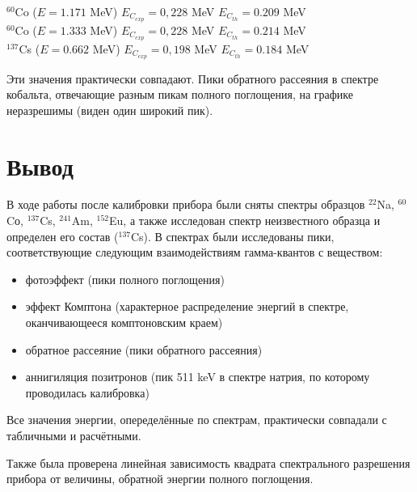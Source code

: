 \documentclass[a4paper, 12pt]{article}
\begin{document}
\begin{enumerate}
\begin{center}
  $^{60}$Co ($E = 1.171$ MeV) \hspace{1cm} $E_C_{exp} = 0,228$ MeV \hspace{1cm} $E_C_{th} = 0.209$ MeV \\
    $^{60}$Co ($E = 1.333$ MeV)\hspace{1cm} $E_C_{exp} = 0,228$ MeV \hspace{1cm} $E_C_{th} = 0.214$ MeV \\
$^{137}$Cs ($E = 0.662$ MeV)\hspace{1cm} $E_C_{exp} =0,198$ MeV \hspace{1cm} $E_C_{th} = 0.184$ MeV \\
\end{center}

Эти значения практически совпадают. Пики обратного рассеяния в спектре кобальта, отвечающие разным пикам полного поглощения, на графике неразрешимы (виден один широкий пик).

\end{enumerate}

\section*{Вывод}

В ходе работы после калибровки прибора были сняты спектры образцов $^{22}$Na,  $^{60}$Cо,  $^{137}$Cs, $^{241}$Am, $^{152}$Eu, а также исследован спектр неизвестного образца и определен его состав ($^{137}$Cs). В спектрах были исследованы пики, соответствующие следующим взаимодействиям гамма-квантов с веществом:
\begin{itemize}
    \item фотоэффект (пики полного поглощения)
    \item эффект Комптона (характерное распределение энергий в спектре, оканчивающееся комптоновским краем)
    \item обратное рассеяние (пики обратного рассеяния)
    \item аннигиляция позитронов (пик 511 keV в спектре натрия, по которому проводилась калибровка)
\end{itemize}

Все значения энергии, опеределённые по спектрам, практически совпадали с табличными и расчётными. \par

Также была проверена линейная зависимость квадрата спектрального разрешения прибора от величины, обратной энергии полного поглощения.
\end{document}
